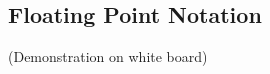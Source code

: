 \documentclass[]{report}
\begin{document}


\subsection*{Floating Point Notation}
(Demonstration on white board)
\end{document}
